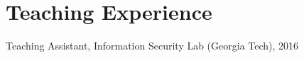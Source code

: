 \section*{Teaching Experience}
\begin{description}

\item Teaching Assistant, Information Security Lab (Georgia Tech), 2016

\end{description}
